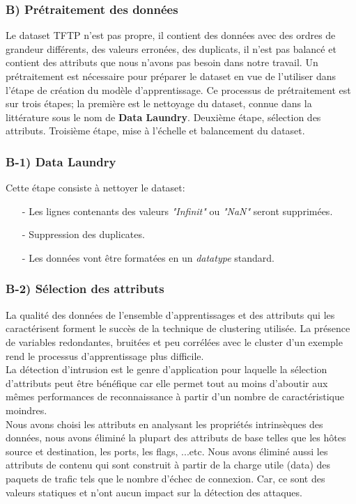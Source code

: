 \begin{table}[h]
\begin{center}
\subsubsection{B) Prétraitement des données }
Le dataset TFTP n'est pas propre, il contient des données avec des ordres de grandeur différents, des valeurs erronées, des duplicats, il n'est pas balancé et contient des attributs que nous n'avons pas besoin dans notre travail. Un prétraitement est nécessaire pour préparer le dataset en vue de l'utiliser dans l'étape de création du modèle d'apprentissage. Ce processus de prétraitement est sur trois étapes; la première est le nettoyage du dataset, connue dans la littérature sous le nom de \textbf{Data Laundry}. Deuxième étape, sélection des attributs. Troisième étape, mise à l'échelle et balancement du dataset.

\subsubsection{B-1) Data Laundry}
Cette étape consiste à nettoyer le dataset:\\
\begin{itemize}
\item[-] Les lignes contenants des valeurs \textit{"Infinit"} ou \textit{"NaN"} seront supprimées.
\item[-] Suppression des duplicates.
\item[-] Les données vont être formatées en un \textit{datatype} standard.
\end{itemize}

\subsubsection{B-2) Sélection des attributs}
\label{attributs}
La qualité des données de l’ensemble d’apprentissages et des attributs qui les caractérisent forment le succès de la technique de clustering utilisée. La présence de variables redondantes, bruitées et peu corrélées avec le cluster d’un exemple rend le processus d’apprentissage plus difficile.\\

\noindent La détection d’intrusion est le genre d’application pour laquelle la sélection d’attributs peut être bénéfique car elle permet tout au moins d’aboutir aux mêmes performances de reconnaissance à partir d’un nombre de caractéristique moindres.\\

\noindent Nous avons choisi les attributs en analysant les propriétés intrinsèques des données, nous avons éliminé la plupart des attributs de base telles que  les hôtes source et destination, les ports, les flags, ...etc. Nous avons éliminé aussi les attributs de contenu qui sont construit à partir de la charge utile (data) des paquets de trafic tels que le nombre d’échec de connexion.  Car, ce sont des valeurs statiques et n’ont aucun impact sur la détection des attaques.\\


\end{center}
\end{table}
